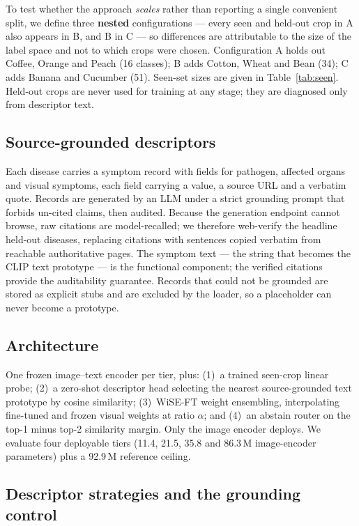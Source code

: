 \documentclass[a4paper,fleqn]{cas-dc}
\begin{document}
To test whether the approach \emph{scales} rather than reporting a single convenient split, we define
three \textbf{nested} configurations --- every seen and held-out crop in A also appears in B, and B in
C --- so differences are attributable to the size of the label space and not to which crops were
chosen. Configuration A holds out Coffee, Orange and Peach (16 classes); B adds Cotton, Wheat and Bean
(34); C adds Banana and Cucumber (51). Seen-set sizes are given in Table~\ref{tab:seen}. Held-out crops
are never used for training at any stage; they are diagnosed only from descriptor text.

\subsection{Source-grounded descriptors}
\label{sec:desc-gen}

Each disease carries a symptom record with fields for pathogen, affected organs and visual symptoms,
each field carrying a value, a source URL and a verbatim quote. Records are generated by an LLM under a
strict grounding prompt that forbids un-cited claims, then audited. Because the generation endpoint
cannot browse, raw citations are model-recalled; we therefore web-verify the headline held-out
diseases, replacing citations with sentences copied verbatim from reachable authoritative pages. The
symptom text --- the string that becomes the CLIP text prototype --- is the functional component; the
verified citations provide the auditability guarantee. Records that could not be grounded are stored as
explicit stubs and are excluded by the loader, so a placeholder can never become a prototype.

\subsection{Architecture}

One frozen image--text encoder per tier, plus: (1)~a trained seen-crop linear probe; (2)~a zero-shot
descriptor head selecting the nearest source-grounded text prototype by cosine similarity;
(3)~WiSE-FT weight ensembling, interpolating fine-tuned and frozen visual weights at ratio $\alpha$;
and (4)~an abstain router on the top-1 minus top-2 similarity margin. Only the image encoder deploys.
We evaluate four deployable tiers (11.4, 21.5, 35.8 and 86.3\,M image-encoder parameters) plus a
92.9\,M reference ceiling.

\subsection{Descriptor strategies and the grounding control}
\label{sec:strategies}
\end{document}
